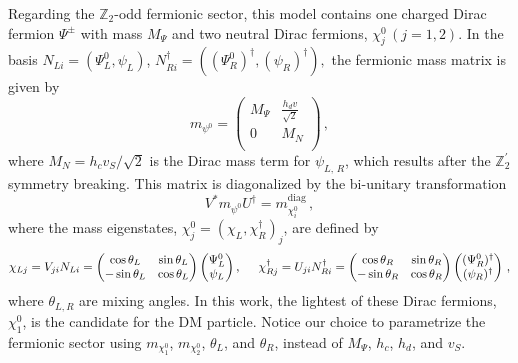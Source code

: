 \documentclass[12pt,letterpaper]{article}
\begin{document}
Regarding the $\mathbb{Z}_2$-odd fermionic sector, this model contains one charged Dirac fermion $\Psi^{\pm}$ with mass $M_{\Psi}$ and two neutral Dirac fermions, $\chi_j^0\, (j=1,2)$.  
In the basis $N_{Li}=(\Psi_{L}^0,\psi_{L})$, $N_{Ri}^{\dagger}=((\Psi_R^0)^{\dagger},(\psi_{R})^{\dagger}),$ the fermionic mass matrix is given by
\begin{equation}
\label{eq:mchi-matrix}
m_{\psi^0}=
\left(
\begin{array}{cc}
 M_{\Psi } & \frac{h_d v}{\sqrt{2}} \\
 0 & M_N \\
\end{array}
\right)\,,
\end{equation}
where $M_N=h_c v_S/\sqrt{2}$ is the Dirac mass term for $\psi_{L,\,R}$, which results after the $\mathbb{Z}_2^{'}$ symmetry breaking.  
This matrix is diagonalized by the bi-unitary transformation
\begin{equation}
\label{eq:mchi-diag}
V^*m_{\psi^0}U^{\dagger} = m_{\chi_i^0}^{\text{diag}}\,,
\end{equation}
where the mass eigenstates, $\chi_j^0=(\chi_{L},\chi_{R}^{\dagger})_j$,  are defined by
\begin{equation}
\label{eq:chi-fermions}
\chi_{Lj} 
= V_{ji}N_{Li} 
= \begin{pmatrix}
 \cos\theta_L & \sin\theta_L \\
 -\sin\theta_L & \cos\theta_L
\end{pmatrix}
\begin{pmatrix}
\Psi_{L}^0 \\ \psi_{L}
\end{pmatrix},
\hspace{0.5 cm} 
\chi_{Rj}^{\dagger}
= U_{ji}N_{Ri}^{\dagger}
 =\begin{pmatrix}
 \cos\theta_R & \sin\theta_R \\
 -\sin\theta_R & \cos\theta_R
\end{pmatrix}
\begin{pmatrix}
(\Psi_R^0)^{\dagger} \\ (\psi_{R})^{\dagger}
\end{pmatrix} \,,
\end{equation}
where $\theta_{L,R}$ are mixing angles.  
In this work, the lightest of these Dirac fermions, $\chi_1^0$, is the candidate for the DM particle. 
Notice our choice to parametrize the fermionic sector using $m_{\chi_1^0}$, $m_{\chi_2^0}$, $\theta_L$, and $\theta_R$, instead of $M_\Psi$, $h_c$, $h_d$, and $v_S$.
\end{document}
